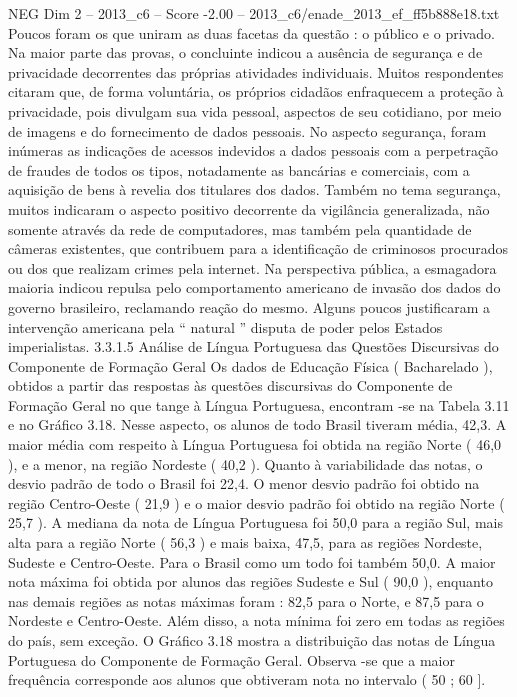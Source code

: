 \begin{textsample}{NEG Dim 2 – 2013\_c6 – Score -2.00 – 2013\_c6/enade\_2013\_ef\_ff5b888e18.txt}
Poucos foram os que uniram as duas facetas da questão : o público e o privado.
Na maior parte das provas, o concluinte indicou a ausência de segurança e de privacidade decorrentes das próprias atividades individuais.
Muitos respondentes citaram que, de forma voluntária, os próprios cidadãos enfraquecem a proteção à privacidade, pois divulgam sua vida pessoal, aspectos de seu cotidiano, por meio de imagens e do fornecimento de dados pessoais.
No aspecto segurança, foram inúmeras as indicações de acessos indevidos a dados pessoais com a perpetração de fraudes de todos os tipos, notadamente as bancárias e comerciais, com a aquisição de bens à revelia dos titulares dos dados.
Também no tema segurança, muitos indicaram o aspecto positivo decorrente da vigilância generalizada, não somente através da rede de computadores, mas também pela quantidade de câmeras existentes, que contribuem para a identificação de criminosos procurados ou dos que realizam crimes pela internet.
Na perspectiva pública, a esmagadora maioria indicou repulsa pelo comportamento americano de invasão dos dados do governo brasileiro, reclamando reação do mesmo.
Alguns poucos justificaram a intervenção americana pela “ natural ” disputa de poder pelos Estados imperialistas. 3.3.1.5 Análise de Língua Portuguesa das Questões Discursivas do Componente de Formação Geral Os dados de Educação Física ( Bacharelado ), obtidos a partir das respostas às questões discursivas do Componente de Formação Geral no que tange à Língua Portuguesa, encontram -se na Tabela 3.11 e no Gráfico 3.18.
Nesse aspecto, os alunos de todo Brasil tiveram média, 42,3.
A maior média com respeito à Língua Portuguesa foi obtida na região Norte ( 46,0 ), e a menor, na região Nordeste ( 40,2 ).
Quanto à variabilidade das notas, o desvio padrão de todo o Brasil foi 22,4.
O menor desvio padrão foi obtido na região Centro-Oeste ( 21,9 ) e o maior desvio padrão foi obtido na região Norte ( 25,7 ).
A mediana da nota de Língua Portuguesa foi 50,0 para a região Sul, mais alta para a região Norte ( 56,3 ) e mais baixa, 47,5, para as regiões Nordeste, Sudeste e Centro-Oeste.
Para o Brasil como um todo foi também 50,0.
A maior nota máxima foi obtida por alunos das regiões Sudeste e Sul ( 90,0 ), enquanto nas demais regiões as notas máximas foram : 82,5 para o Norte, e 87,5 para o Nordeste e Centro-Oeste.
Além disso, a nota mínima foi zero em todas as regiões do país, sem exceção.
O Gráfico 3.18 mostra a distribuição das notas de Língua Portuguesa do Componente de Formação Geral.
Observa -se que a maior frequência corresponde aos alunos que obtiveram nota no intervalo ( 50 ; 60 ].

\end{textsample}
